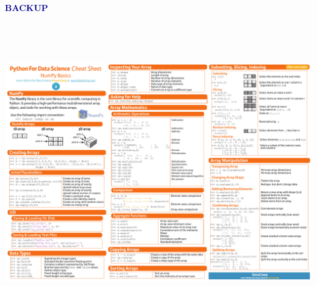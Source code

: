 \documentclass[aspectratio=169]{beamer}
\begin{document}
\begin{frame}{\mbox{ }}
\LARGE
\begin{center}
\textcolor{darkblue}{\bf BACKUP}
\end{center}
\end{frame}

\begin{frame}{\mbox{ }}
\vspace{0.5 cm}
\begin{center}
\end{center}
\end{frame}

\begin{frame}{\mbox{ }}
\begin{center}
\includegraphics[width=0.8\linewidth]{img/Numpy_Python_Cheat_Sheet.pdf}
\end{center}
\end{frame}
\end{document}
